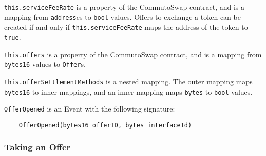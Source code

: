 \documentclass[11pt]{article}
\begin{document}
    \verb|this.serviceFeeRate| is a property of the CommutoSwap contract, and is a mapping from
    \verb|address|es to \verb|bool| values.
    Offers to exchange a token can be created if and only if \verb|this.serviceFeeRate| maps the
    address of the token to \verb|true|.

    \verb|this.offers| is a property of the CommutoSwap contract, and is a mapping from
    \verb|bytes16| values to \verb|Offer|s.

    \verb|this.offerSettlementMethods| is a nested mapping.
    The outer mapping maps \verb|bytes16| to inner mappings, and an inner mapping maps \verb|bytes|
    to \verb|bool| values.

    \verb|OfferOpened| is an Event with the following signature:
    \begin{verbatim}
    OfferOpened(bytes16 offerID, bytes interfaceId)
    \end{verbatim}

    \subsubsection*{Taking an Offer}
\end{document}
